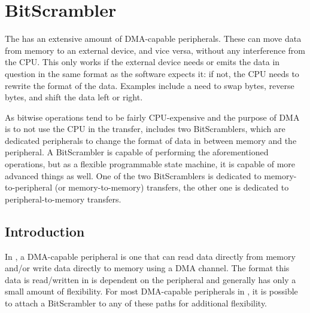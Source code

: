 \documentclass[main\_\_EN.tex]{subfiles}
\begin{document}

\ifglobal
\else
    {\let\clearpage\relax \listoftodos}
    {\let\clearpage\relax \listofdonetodos}
    \tableofcontents
\fi



\hypertarget{bitscrm}{}
\chapter{BitScrambler}
\label{mod:bitscrm}


The \chipname{} has an extensive amount of DMA-capable peripherals. These can move data from memory to an external device, and vice versa, without any interference from the CPU. This only works if the external device needs or emits the data in question in the same format as the software expects it: if not, the CPU needs to rewrite the format of the data. Examples include a need to swap bytes, reverse bytes, and shift the data left or right.

As bitwise operations tend to be fairly CPU-expensive and the purpose of DMA is to not use the CPU in the transfer, \chipname{} includes two BitScramblers, which are dedicated peripherals to change the format of data in between memory and the peripheral. A BitScrambler is capable of performing the aforementioned operations, but as a flexible programmable state machine, it is capable of more advanced things as well. One of the two BitScramblers is dedicated to memory-to-peripheral (or memory-to-memory) transfers, the other one is dedicated to peripheral-to-memory transfers.



\section{Introduction}

In \chipname{}, a DMA-capable peripheral is one that can read data directly from memory and/or write data directly to memory using a DMA channel. The format this data is read/written in is dependent on the peripheral and generally has only a small amount of flexibility. For most DMA-capable peripherals in \chipname{}, it is possible to attach a BitScrambler to any of these paths for additional flexibility.
\end{document}
